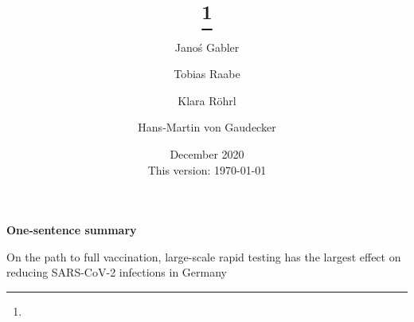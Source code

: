 

\title{\sffamily\bfseries%
	\papertitle%
	\thanks{\protect}%
}

\author[a, b]{Janoś Gabler}
\author[c]{Tobias Raabe}
\author[a]{Klara Röhrl}
\author[b,d]{Hans-Martin von Gaudecker}


\date{%
	\vfill%
	December 2020 \\
	This version: \today%
}

\maketitle

\vfill

\textbf{One-sentence summary}

On the path to full vaccination, large-scale rapid testing has the largest effect on reducing SARS-CoV-2 infections in Germany

\begin{abstract}%
\end{abstract}

\vfill

\clearpage

